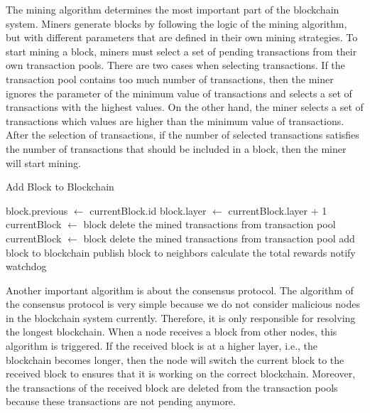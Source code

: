 The mining algorithm determines the most important part of the blockchain system. Miners generate blocks by following the logic of the mining algorithm, but with different parameters that are defined in their own mining strategies. To start mining a block, miners must select a set of pending transactions from their own transaction pools. There are two cases when selecting transactions. If the transaction pool contains too much number of transactions, then the miner ignores the parameter of the minimum value of transactions and selects a set of transactions with the highest values. On the other hand, the miner selects a set of transactions which values are higher than the minimum value of transactions. After the selection of transactions, if the number of selected transactions satisfies the number of transactions that should be included in a block, then the miner will start mining.

\begin{algorithm}
    \caption{Add Block to Blockchain}
    \label{alg:add block to blockchain}
\begin{algorithmic}[1]
        \State block.previous $\gets$ currentBlock.id
        \State block.layer $\gets$ currentBlock.layer + 1
        \State currentBlock $\gets$ block
        \State delete the mined transactions from transaction pool
        \State currentBlock $\gets$ block
        \State delete the mined transactions from transaction pool
    \EndIf
    \State
    \State add block to blockchain
    \State publish block to neighbors
    \State calculate the total rewards
    \State notify watchdog
    \EndProcedure
\end{algorithmic}
\end{algorithm}

Another important algorithm is about the consensus protocol. The algorithm of the consensus protocol is very simple because we do not consider malicious nodes in the blockchain system currently. Therefore, it is only responsible for resolving the longest blockchain. When a node receives a block from other nodes, this algorithm is triggered. If the received block is at a higher layer, i.e., the blockchain becomes longer, then the node will switch the current block to the received block to ensures that it is working on the correct blockchain. Moreover, the transactions of the received block are deleted from the transaction pools because these transactions are not pending anymore.

